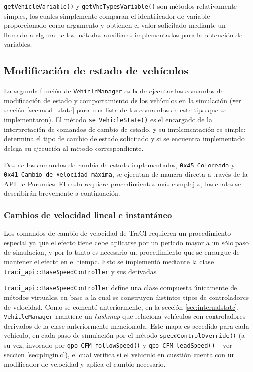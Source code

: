 \texttt{getVehicleVariable()} y \texttt{getVhcTypesVariable()} son métodos relativamente simples, los cuales simplemente comparan el identificador de variable proporcionado como argumento y obtienen el valor solicitado mediante un llamado a alguna de los métodos auxiliares implementados para la obtención de variables.

\subsection{Modificación de estado de vehículos}

La segunda función de \texttt{VehicleManager} es la de ejecutar los comandos de modificación de estado y comportamiento de los vehículos en la simulación (ver sección \ref{sec:mod_state} para una lista de los comandos de este tipo que se implementaron). El método \texttt{setVehicleState()} es el encargado de la interpretación de comandos de cambio de estado, y su implementación es simple; determina el tipo de cambio de estado solicitado y si se encuentra implementado delega su ejecución al método correspondiente.

Dos de los comandos de cambio de estado implementados, \texttt{0x45 Coloreado} y \texttt{0x41 Cambio de velocidad máxima}, se ejecutan de manera directa a través de la API de Paramics. El resto requiere procedimientos más complejos, los cuales se describirán brevemente a continuación.

\subsubsection{Cambios de velocidad lineal e instantáneo}\label{sec:speedoverride}

Los comandos de cambio de velocidad de TraCI requieren un procedimiento especial ya que el efecto tiene debe aplicarse por un periodo mayor a un sólo paso de simulación, y por lo tanto es necesario un procedimiento que se encargue de mantener el efecto en el tiempo. Esto se implementó mediante la clase \texttt{traci\_api::BaseSpeedController} y sus derivadas.

\texttt{traci\_api::BaseSpeedController} define una clase compuesta únicamente de métodos virtuales, en base a la cual se construyen distintos tipos de controladores de velocidad. Como se comentó anteriormente, en la sección \ref{sec:internalstate}, \texttt{VehicleManager} mantiene un \emph{hashmap} que relaciona vehículos con controladores derivados de la clase anteriormente mencionada. Este mapa es accedido para cada vehículo, en cada paso de simulación por el método \texttt{speedControlOverride()} (a su vez, invocado por \texttt{qpo\_CFM\_followSpeed()} y \texttt{qpo\_CFM\_leadSpeed()} -- ver sección \ref{sec:plugin.c}), el cual verifica si el vehículo en cuestión cuenta con un modificador de velocidad y aplica el cambio necesario.

